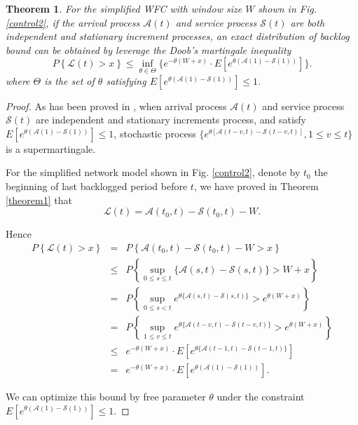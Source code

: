 \documentclass[12pt]{article}
\newtheorem{theorem}{Theorem}
\newtheorem{proof}{Proof}
\begin{document}
\begin{theorem}\label{theorem3}
For the simplified WFC with window size $W$ shown in Fig. \ref{control2}, if the arrival process $\mathcal{A}(t)$ and service process $\mathcal{S}(t)$ are both independent and stationary increment processes, an exact distribution of backlog bound can be obtained by leverage the Doob's martingale inequality
\begin{equation}\label{eqn3}
P\left\{\mathcal{L}(t)>x\right\}\leq \inf_{\theta\in\Theta}\{e^{-\theta(W+x)}\cdot E[e^{\theta(\mathcal{A}(1)-\mathcal{S}(1))}]\}.
\end{equation}
where $\Theta$ is the set of $\theta$ satisfying $E[e^{\theta(\mathcal{A}(1)-\mathcal{S}(1))}]\leq 1$.
\end{theorem}
\begin{proof}
As has been proved in \cite{jiang2009network,Ciucu2007Network}, when arrival process $\mathcal{A}(t)$ and service process $\mathcal{S}(t)$ are independent and stationary increments process, and satisfy $E[e^{\theta(\mathcal{A}(1)-\mathcal{S}(1))}]\leq 1$, stochastic process $\{e^{\theta[\mathcal{A}(t-v,t)-\mathcal{S}(t-v,t)]},1\leq v\leq t\}$ is a supermartingale.

For the simplified network model shown in Fig. \ref{control2}, denote by $t_{0}$ the beginning of last backlogged period before $t$, we have proved in Theorem \ref{theorem1} that
$$\mathcal{L}(t)=\mathcal{A}(t_0,t)-\mathcal{S}(t_0,t)-W.$$

Hence
\begin{eqnarray*}
P\left\{\mathcal{L}(t)>x\right\}  &=&P\left\{\mathcal{A}(t_{0},t)-\mathcal{S}(t_{0},t)-W>x\right\}\\
  &\leq& P\left\{\sup_{0\leq s\leq t}\{\mathcal{A}(s,t)-\mathcal{S}(s,t)\}>W+x\right\}\\
  &=& P\left\{\sup_{0\leq s< t}e^{\theta\{\mathcal{A}(s,t)-\mathcal{S}(s,t)\}}>e^{\theta(W+x)}\right\}\\
  &=& P\left\{\sup_{1\leq v\leq t}e^{\theta\{\mathcal{A}(t-v,t)-\mathcal{S}(t-v,t)\}}>e^{\theta(W+x)}\right\}\\
  &\leq& e^{-\theta(W+x)}\cdot E[e^{\theta\{\mathcal{A}(t-1,t)-\mathcal{S}(t-1,t)\}}]\\
  &=& e^{-\theta(W+x)}\cdot E[e^{\theta(\mathcal{A}(1)-\mathcal{S}(1))}].
\end{eqnarray*}

We can optimize this bound by free parameter $\theta$ under the constraint $E[e^{\theta(\mathcal{A}(1)-\mathcal{S}(1))}]\leq 1$.
\end{proof}
\end{document}
